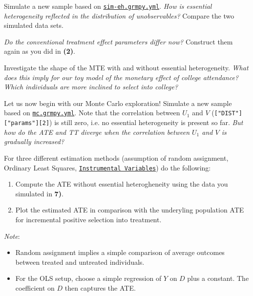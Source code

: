 \begin{boenumerate}\setcounter{enumi}{3}
  
  \item Simulate a new sample based on \href{https://github.com/HumanCapitalAnalysis/microeconometrics/blob/prset_grmpy/problem-sets/04-generalized-roy-model/sources/sim-eh.grmpy.yml}{\texttt{sim-eh.grmpy.yml}}. \emph{How is essential heterogeneity reflected in the distribution of unobservables?} Compare the two simulated data sets.
  
  \item \emph{Do the conventional treatment effect parameters differ now?} Construct them again as you did in \textbf{(2)}.
  
  \item Investigate the shape of the MTE with and without essential heterogeneity. \emph{What does this imply for our toy model of the monetary effect of college attendance? Which individuals are more inclined to select into college?}
  
  \item Let us now begin with our Monte Carlo exploration! Simulate a new sample based on \href{https://github.com/HumanCapitalAnalysis/microeconometrics/blob/prset_grmpy/problem-sets/04-generalized-roy-model/sources/mc.grmpy.yml}{\texttt{mc.grmpy.yml}}. Note that the correlation between $U_1$ and $V$ (\texttt{["DIST"]["params"][2]}) is still zero, i.e. no essential heterogeneity is present so far. \emph{But how do the ATE and TT diverge when the correlation between $U_1$ and $V$ is gradually increased?}
  
  \item For three different estimation methods (assumption of random assignment, Ordinary Least Squares, \href{https://bashtage.github.io/linearmodels/doc/iv/introduction.html}{\texttt{Instrumental Variables}}) do the following:
  \begin{enumerate}
  	\item Compute the ATE without essential heterogheneity using the data you simulated in \textbf{7)}.
  	\item Plot the estimated ATE in comparison with the underyling population ATE for incremental positive selection into treatment. 
  	
  \end{enumerate}

  \textit{Note}: 
  \begin{itemize}
  	\item Random assignment implies a simple comparison of average outcomes between treated and untreated individuals.
  	\item For the OLS setup, choose a simple regression of $Y$ on $D$ plus a constant. The coefficient on $D$ then captures the ATE. 
  	

\end{itemize}
\end{boenumerate}
